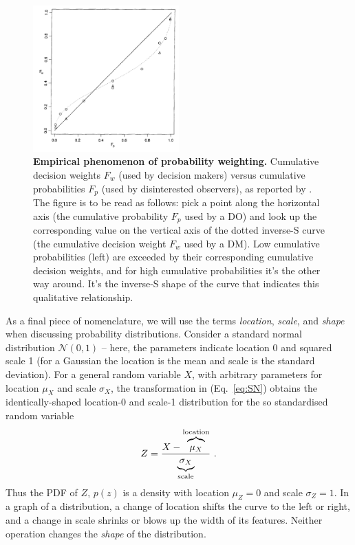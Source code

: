 \documentclass[a4paper, 12pt]{article}
\newcommand{\elabel}[1]{\label{eq:#1}}
\newcommand{\eref}[1]{(Eq.~\ref{eq:#1})}
\newcommand{\flabel}[1]{\label{fig:#1}}
\newcommand{\be}{\begin{equation}}
\newcommand{\ee}{\end{equation}}
\newcommand{\ND}{\mathcal{N}} %
\begin{document}
\begin{figure}[!htb]
\centering
\includegraphics[width=0.5\textwidth]{./figs/TK1992.PNG}
\caption{{\bf Empirical phenomenon of probability weighting.} Cumulative decision weights $F_w$ (used by decision makers) versus cumulative probabilities $F_p$ (used by disinterested observers), as reported by \citet[p.~310, Fig. 1, relabelled axes]{TverskyKahneman1992}. The figure is to be read as follows: pick a point along the horizontal axis (the cumulative probability $F_p$ used by a DO) and look up the corresponding value on the vertical axis of the dotted inverse-S curve (the cumulative decision weight $F_w$ used by a DM). Low cumulative probabilities (left) are exceeded by their corresponding cumulative decision weights, and for high cumulative probabilities it's the other way around. It's the inverse-S shape of the curve that indicates this qualitative relationship.}
\flabel{TK1992}
\end{figure}

As a final piece of nomenclature, we will use the terms \textit{location}, \textit{scale}, and {\it shape} when discussing probability distributions. Consider a standard normal distribution $\ND(0,1)$ -- here, the parameters indicate location 0 and squared scale 1 (for a Gaussian the location is the mean and scale is the standard deviation). For a general random variable $X$, with arbitrary parameters for location $\mu_X$ and scale $\sigma_X$, the transformation in \eref{SN} obtains the identically-shaped location-0 and scale-1 distribution for the so standardised random variable
\be \elabel{SN}
	Z = \frac{X-\overbrace{\mu_X \mathstrut}^{\text{location}}}{\underbrace{\sigma_X\mathstrut}_{\text{scale}}}
~.
\ee
Thus the PDF of $Z$, $p(z)$ is a density with location $\mu_Z=0$ and scale $\sigma_Z=1$. In a graph of a distribution, a change of location shifts the curve to the left or right, and a change in scale shrinks or blows up the width of its features. Neither operation changes the {\it shape} of the distribution.
\end{document}

